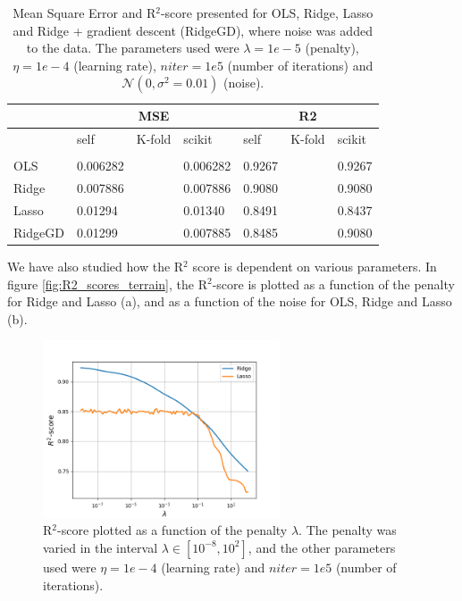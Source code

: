 \begin{table} [H]
	\caption{Mean Square Error and R$^2$-score presented for OLS, Ridge, Lasso and Ridge + gradient descent (RidgeGD), where noise was added to the data. The parameters used were $\lambda=1e-5$ (penalty), $\eta=1e-4$ (learning rate), $niter=1e5$ (number of iterations) and $\mathcal{N}(0, \sigma^2=0.01)$ (noise). \vspace{2mm}}
	\begin{tabularx}{\textwidth}{l|XXX|XXX} \hline\hline
		\label{tab:terrain_error}
		& \multicolumn{3}{c}{\textbf{MSE}}&\multicolumn{3}{c}{\textbf{R2}}\\ \hline
		&self&K-fold&scikit&self&K-fold&scikit\\ \hline \\
		OLS & 0.006282 && 0.006282 & 0.9267 && 0.9267\\
		Ridge & 0.007886 && 0.007886 & 0.9080 && 0.9080 \\
		Lasso & 0.01294 && 0.01340 & 0.8491 && 0.8437 \\
		RidgeGD & 0.01299 && 0.007885 & 0.8485 && 0.9080 \\ \hline
	\end{tabularx}
\end{table}

We have also studied how the R$^2$ score is dependent on various parameters. In figure \eqref{fig:R2_scores_terrain}, the R$^2$-score is plotted as a function of the penalty for Ridge and Lasso (a), and as a function of the noise for OLS, Ridge and Lasso (b).

\begin{figure} [H]
	\centering
	\includegraphics[width=7cm]{../plots/lambda_R2score_terrain.png}
	\caption{R$^2$-score plotted as a function of the penalty $\lambda$. The penalty was varied in the interval $\lambda\in[10^{-8},10^2]$, and the other parameters used were $\eta=1e-4$ (learning rate) and $niter=1e5$ (number of iterations).}
	\label{fig:R2_scores_terrain}
\end{figure}

